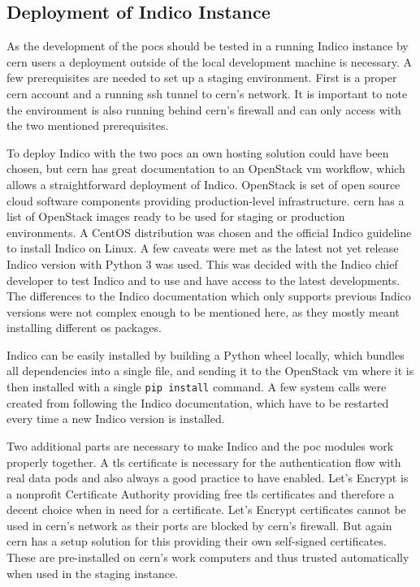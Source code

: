 \subsection{Deployment of Indico Instance}

As the development of the \glspl{poc} should be tested in a running Indico instance by \gls{cern} users a deployment outside of the local development machine is necessary. A few prerequisites are needed to set up a staging environment. First is a proper \gls{cern} account and a running \gls{ssh} tunnel to \gls{cern}'s network. It is important to note the environment is also running behind \gls{cern}'s firewall and can only access with the two mentioned prerequisites.

To deploy Indico with the two \glspl{poc} an own hosting solution could have been chosen, but \gls{cern} has great documentation to an OpenStack \gls{vm} \cite{openstack} workflow, which allows a straightforward deployment of Indico. OpenStack is set of open source cloud software components providing production-level infrastructure. \gls{cern} has a list of OpenStack images ready to be used for staging or production environments. A CentOS \cite{centos} distribution was chosen and the official Indico guideline to install Indico on Linux. A few caveats were met as the latest not yet release Indico version with Python 3 was used. This was decided with the Indico chief developer to test Indico and to use and have access to the latest developments. The differences to the Indico documentation which only supports previous Indico versions were not complex enough to be mentioned here, as they mostly meant installing different \gls{os} packages.

Indico can be easily installed by building a Python wheel locally, which bundles all dependencies into a single file, and sending it to the OpenStack \gls{vm} where it is then installed with a single \texttt{pip install} command. A few system calls were created from following the Indico documentation, which have to be restarted every time a new Indico version is installed.

Two additional parts are necessary to make Indico and the \gls{poc} modules work properly together. A \gls{tls} certificate is necessary for the authentication flow with real data pods and also always a good practice to have enabled. Let's Encrypt \cite{letsencrypt} is a nonprofit Certificate Authority providing free \gls{tls} certificates and therefore a decent choice when in need for a certificate. Let's Encrypt certificates cannot be used in \gls{cern}'s network as their ports are blocked by \gls{cern}'s firewall. But again \gls{cern} has a setup solution for this providing their own self-signed certificates. These are pre-installed on \gls{cern}'s work computers and thus trusted automatically when used in the staging instance.

